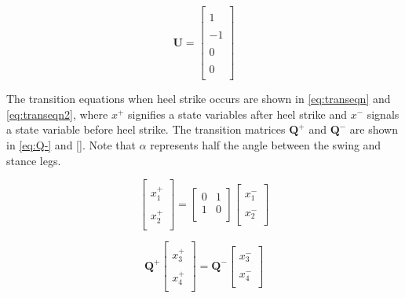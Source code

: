 \documentclass{./springer/svjour3}
\newcommand{\mb}[1]{\mathbf{#1}}
\begin{document}
\begin{equation}
\mb{U} = 
\label{eq:U}
\begin{bmatrix}
\\1\\
\\-1\\
\\0\\
\\0\\
\end{bmatrix}
\end{equation}



The transition equations when heel strike occurs are shown in \ref{eq:transeqn} and \ref{eq:transeqn2}, where $x^+$ signifies a state variables after heel strike and $x^-$ 
signals a state variable before
heel strike. The transition matrices $\mb{Q^+}$ and $\mb{Q^-}$ are shown in \ref{eq:Q-} and \ref{}. Note that $\alpha$ represents half the angle between the swing and stance 
legs.

\begin{equation}
\label{eq:transeqn}
\begin{bmatrix}
\\x_1^+\\
\\x_2^+\\
\end{bmatrix}
 = 
\begin{bmatrix}
0 & 1\\
1 & 0\\
\end{bmatrix}
\begin{bmatrix}
\\x_1^-\\
\\x_2^-\\
\end{bmatrix}
\end{equation}

\begin{equation}
\label{eq:transeqn2}
\mb{Q^+}
\begin{bmatrix}
\\x_3^+\\
\\x_4^+\\
\end{bmatrix}
= 
\mb{Q^-}
\begin{bmatrix}
\\x_3^-\\
\\x_4^-\\
\end{bmatrix}
\end{equation}
\end{document}
